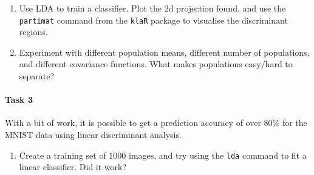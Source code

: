 \documentclass[
]{book}
\newenvironment{Shaded}{\begin{snugshade}}{\end{snugshade}}
\newcommand{\DecValTok}[1]{\textcolor[rgb]{0.00,0.00,0.81}{#1}}
\newcommand{\FunctionTok}[1]{\textcolor[rgb]{0.00,0.00,0.00}{#1}}
\newcommand{\NormalTok}[1]{#1}
\newcommand{\OtherTok}[1]{\textcolor[rgb]{0.56,0.35,0.01}{#1}}
\newcommand{\SpecialCharTok}[1]{\textcolor[rgb]{0.00,0.00,0.00}{#1}}
\newcommand{\StringTok}[1]{\textcolor[rgb]{0.31,0.60,0.02}{#1}}
\providecommand{\tightlist}{%
  \setlength{\itemsep}{0pt}\setlength{\parskip}{0pt}}
\theoremstyle{definition}
\theoremstyle{definition}
\theoremstyle{definition}
\theoremstyle{definition}
\theoremstyle{remark}
\begin{document}
\begin{enumerate}
\def\labelenumi{\roman{enumi}.}
\setcounter{enumi}{1}
\item
  Use LDA to train a classifier. Plot the 2d projection found, and use the \texttt{partimat} command from the \texttt{klaR} package to visualise the discriminant regions.
\item
  Experiment with different population means, different number of populations, and different covariance functions. What makes populations easy/hard to separate?
\end{enumerate}

\hypertarget{task-3-3}{%
\paragraph*{Task 3}\label{task-3-3}}

With a bit of work, it is possible to get a prediction accuracy of over 80\% for the MNIST data using linear discriminant analysis.

\begin{enumerate}
\def\labelenumi{\roman{enumi}.}
\tightlist
\item
  Create a training set of 1000 images, and try using the \texttt{lda} command to fit a linear classifier. Did it work?
\end{enumerate}

\begin{Shaded}
\end{Shaded}
\end{document}
